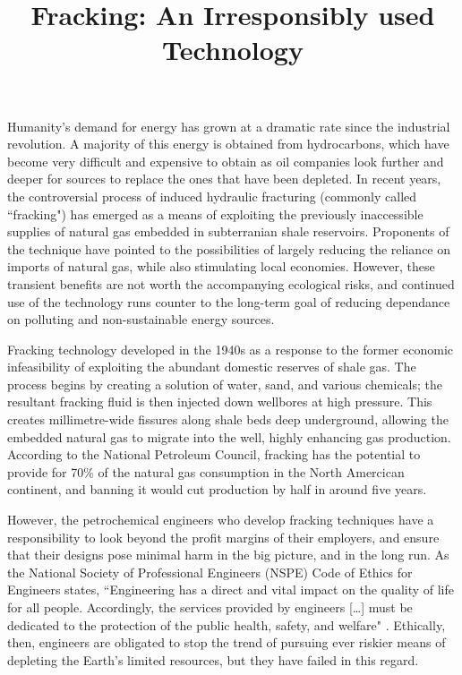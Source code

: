 \documentclass[12pt,letterpaper]{article}
\title{Fracking: An Irresponsibly used Technology}
\begin{document}
\makeheader

Humanity's demand for energy has grown at a dramatic rate since the industrial revolution. A majority of this energy is obtained from hydrocarbons, which have become very difficult and expensive to obtain as oil companies look further and deeper for sources to replace the ones that have been depleted. In recent years, the controversial process of induced hydraulic fracturing (commonly called ``fracking") has emerged as a means of exploiting the previously inaccessible supplies of natural gas embedded in subterranian shale reservoirs. Proponents of the technique have pointed to the possibilities of largely reducing the reliance on imports of natural gas, while also stimulating local economies. However, these transient benefits are not worth the accompanying ecological risks, and continued use of the technology runs counter to the long-term goal of reducing dependance on polluting and non-sustainable energy sources.

Fracking technology developed in the 1940s as a response to the former economic infeasibility of exploiting the abundant domestic reserves of shale gas.
The process begins by creating a solution of water, sand, and various chemicals; the resultant fracking fluid is then injected down wellbores at high pressure. This creates millimetre-wide fissures along shale beds deep underground, allowing the embedded natural gas to migrate into the well, highly enhancing gas production. According to the National Petroleum Council, fracking has the potential to provide for 70\%  \cite{npc}  of the natural gas consumption in the North Amercican continent, and banning it would cut production by half in around five years.

However, the petrochemical engineers who develop fracking techniques have a responsibility to look beyond the profit margins of their employers, and ensure that their designs pose minimal harm in the big picture, and in the long run.
As the National Society of Professional Engineers (NSPE) Code of Ethics for Engineers states, 
``Engineering has a direct and vital impact on the quality of life for all people. Accordingly, the services provided by engineers [\ldots] must be dedicated to the protection of the public health, safety, and welfare" \cite{ethics}.
Ethically, then, engineers are obligated to stop the trend of pursuing ever riskier means of depleting the Earth's limited resources, but they have failed in this regard.
\end{document}
